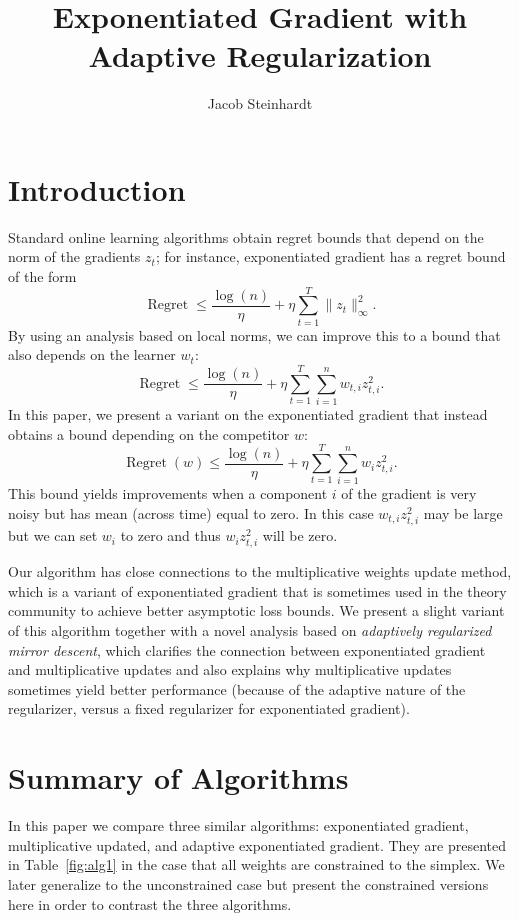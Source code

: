 \documentclass[11pt]{article}
\title{Exponentiated Gradient with Adaptive Regularization}
\author{Jacob Steinhardt}
\DeclareMathOperator{\Regret}{Regret}
\begin{document}
\maketitle
\section{Introduction}
Standard online learning algorithms obtain regret bounds that depend on the 
norm of the gradients $z_t$; for instance, exponentiated gradient has a regret bound 
of the form
\[ \Regret \leq \frac{\log(n)}{\eta} + \eta \sum_{t=1}^T \|z_t\|_{\infty}^2. \]
By using an analysis based on local norms, we can improve this to a bound
that also depends on the learner $w_t$:
\[ \Regret \leq \frac{\log(n)}{\eta} + \eta \sum_{t=1}^T \sum_{i=1}^n w_{t,i} z_{t,i}^2. \]
In this paper, we present a variant on the exponentiated gradient that instead 
obtains a bound depending on the competitor $w$:
\[ \Regret(w) \leq \frac{\log(n)}{\eta} + \eta \sum_{t=1}^T \sum_{i=1}^n w_{i}z_{t,i}^2. \]
This bound yields improvements when a component $i$ of the gradient is 
very noisy but has mean (across time) equal to zero. In this case 
$w_{t,i}z_{t,i}^2$ may be large but we can set $w_i$ to zero and thus $w_iz_{t,i}^2$ 
will be zero. 

Our algorithm has close connections to the multiplicative weights update method, 
which is a variant of exponentiated gradient that is sometimes used in the theory 
community to achieve better asymptotic loss bounds. We present a slight variant 
of this algorithm together with a novel analysis based on 
\emph{adaptively regularized mirror descent}, which clarifies the connection between 
exponentiated gradient and multiplicative updates and also explains why 
multiplicative updates sometimes yield better performance 
(because of the adaptive nature of the regularizer, versus a fixed regularizer for exponentiated gradient).

\section{Summary of Algorithms}
In this paper we compare three similar algorithms: exponentiated gradient, 
multiplicative updated, and adaptive exponentiated gradient. They are presented 
in Table~\ref{fig:alg1} in the case that all weights are constrained to the 
simplex. We later generalize to the unconstrained case but present the constrained 
versions here in order to contrast the three algorithms.
\end{document}
